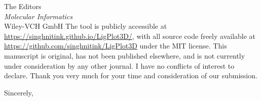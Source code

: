 \documentclass[11pt]{letter}
\makeatletter
\renewcommand{\closing}[1]{\par\nobreak\vspace{\parskip}%
  \stopbreaks
  \noindent
  \ifx\@empty\fromaddress\else
  \hspace*{\longindentation}\fi
  \parbox{\indentedwidth}{\raggedright
       \ignorespaces #1\\[1.2\medskipamount]%
       \ifx\@empty\fromsig
           \fromname
       \else \fromsig \fi\strut}%
   \par}
\makeatother
\begin{document}
\begin{letter}{The Editors\\
\textit{Molecular Informatics}\\
Wiley-VCH GmbH}
The tool is publicly accessible at \url{https://singhnitink.github.io/LigPlot3D/}, with all source code freely available at \url{https://github.com/singhnitink/LigPlot3D} under the MIT license. This manuscript is original, has not been published elsewhere, and is not currently under consideration by any other journal. I have no conflicts of interest to declare. Thank you very much for your time and consideration of our submission.

\closing{Sincerely,}

\end{letter}
\end{document}
